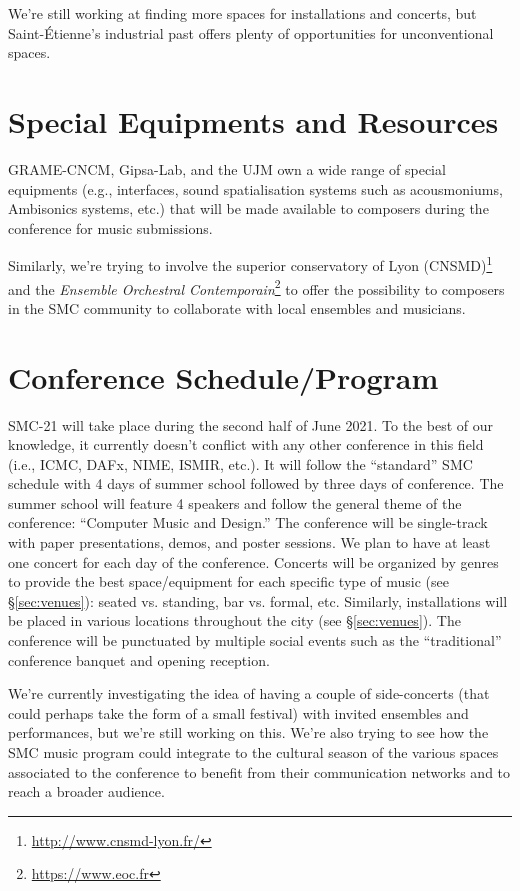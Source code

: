 \documentclass[fontsize=12pt]{scrartcl} %
\numberwithin{equation}{section} %
\numberwithin{figure}{section} %
\numberwithin{table}{section} %
\begin{document}
We're still working at finding more spaces for installations and concerts, but Saint-Étienne's industrial past offers plenty of opportunities for unconventional spaces.  

\section{Special Equipments and Resources}

GRAME-CNCM, Gipsa-Lab, and the UJM own a wide range of special equipments (e.g., interfaces, sound spatialisation systems such as acousmoniums, Ambisonics systems, etc.) that will be made available to composers during the conference for music submissions.

Similarly, we're trying to involve the superior conservatory of Lyon (CNSMD)\footnote{\url{http://www.cnsmd-lyon.fr/}} and the \textit{Ensemble Orchestral Contemporain}\footnote{\url{https://www.eoc.fr}} to offer the possibility to composers in the SMC community to collaborate with local ensembles and musicians. 

\section{Conference Schedule/Program}

SMC-21 will take place during the second half of June 2021. To the best of our knowledge, it currently doesn't conflict with any other conference in this field (i.e., ICMC, DAFx, NIME, ISMIR, etc.). It will follow the ``standard'' SMC schedule with 4 days of summer school followed by three days of conference. The summer school will feature 4 speakers and follow the general theme of the conference: ``Computer Music and Design.'' The conference will be single-track with paper presentations, demos, and poster sessions. We plan to have at least one concert for each day of the conference. Concerts will be organized by genres to provide the best space/equipment for each specific type of music (see \S\ref{sec:venues}): seated vs. standing, bar vs. formal, etc. Similarly, installations will be placed in various locations throughout the city (see \S\ref{sec:venues}). The conference will be punctuated by multiple social events such as the ``traditional'' conference banquet and opening reception.

We're currently investigating the idea of having a couple of side-concerts (that could perhaps take the form of a small festival) with invited ensembles and performances, but we're still working on this. We're also trying to see how the SMC music program could integrate to the cultural season of the various spaces associated to the conference to benefit from their communication networks and to reach a broader audience.
\end{document}
